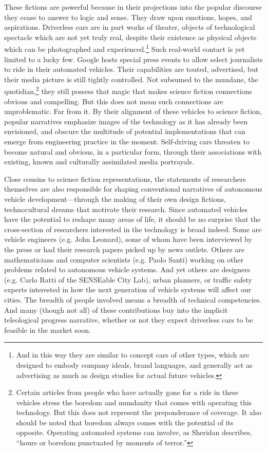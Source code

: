 These fictions are powerful because in their projections into the
popular discourse they cease to answer to logic and
sense. They draw upon emotions, hopes, and aspirations. Driverless cars
are in part works of theater, objects of technological spectacle which
are not yet truly real, despite their existence as physical objects
which can be photographed and experienced.\footnote{And in this way
  they are similar to concept cars of other types, which are designed
  to embody company ideals, brand languages, and generally act as
  advertising as much as design studies for actual future vehicles.}
Such real-world contact is 
yet limited to a lucky few. Google hosts special press events to allow
select journalists
to ride in their automated vehicles. Their capabilities are touted,
advertised, but their media picture is still tightly controlled. Not subsumed
to the mundane, the quotidian,\footnote{Certain articles from people
  who have actually gone for a ride in these vehicles stress the
  boredom and mundanity that comes with operating this
  technology.\cite{rode500} But this does not represent the
  preponderance of coverage. It also should be noted that boredom
  always comes with the potential of its opposite. Operating automated
systems can involve, as Sheridan describes, ``hours or boredom
punctuated by moments of terror.''\cite[p. 339]{sheridan}} they still possess that magic that
makes science fiction connections obvious and compelling. But this
does not mean such connections are unproblematic. Far from it. By
their alignment of these vehicles to science fiction, popular
narratives emphasize images of the technology as it has already been
envisioned, and obscure the multitude of potential implementations
that can emerge from engineering practice in the moment. Self-driving
cars threaten to become natural and obvious, in a particular form,
through their associations with existing, known and culturally
assimilated media portrayals.

Close cousins to science fiction representations, the statements of
researchers themselves are also responsible for 
shaping conventional narratives of autonomous vehicle
development---through the making of their own design fictions,
technocultural dreams that motivate their research.
Since automated vehicles have the potential to reshape many areas of life, it should
be no surprise that the cross-section of researchers interested in the
technology is broad indeed. Some are vehicle engineers (e.g. John Leonard), some of whom have been
interviewed by the press or had their research papers picked up by news outlets.
Others are mathematicians and
computer scientists (e.g. Paolo Santi) working on other problems related to
autonomous vehicle systems. And yet others are designers (e.g. Carlo
Ratti of the SENSEable City Lab), urban
planners, or traffic safety experts interested in how the next
generation of vehicle systems will
affect our cities. The breadth of people involved means a breadth of
technical competencies. And many (though not all) of these contributions buy into the
implicit teleological progress narrative, whether or not they expect
driverless cars to be feasible in the market soon.

